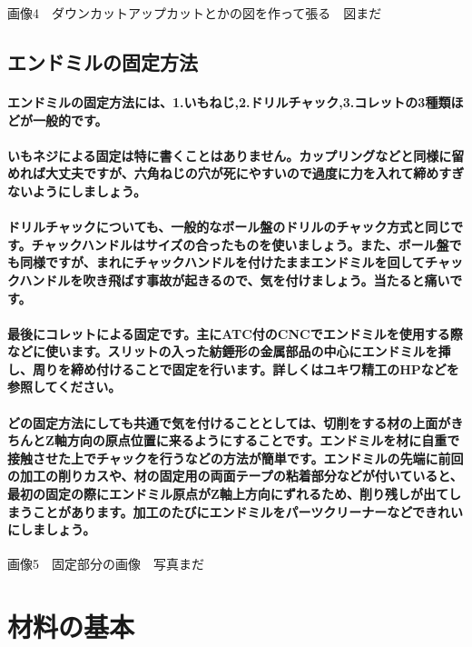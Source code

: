 \documentclass[b5paper, 9pt, twocolumn, titlepage,openany]{jsbook}%
\begin{document}
画像4　ダウンカットアップカットとかの図を作って張る　図まだ

\subsection{エンドミルの固定方法}

\paragraph{エンドミルの固定方法には、1.いもねじ,2.ドリルチャック,3.コレットの3種類ほどが一般的です。}
\paragraph{いもネジによる固定は特に書くことはありません。カップリングなどと同様に留めれば大丈夫ですが、六角ねじの穴が死にやすいので過度に力を入れて締めすぎないようにしましょう。}
\paragraph{ドリルチャックについても、一般的なボール盤のドリルのチャック方式と同じです。チャックハンドルはサイズの合ったものを使いましょう。また、ボール盤でも同様ですが、まれにチャックハンドルを付けたままエンドミルを回してチャックハンドルを吹き飛ばす事故が起きるので、気を付けましょう。当たると痛いです。}
\paragraph{最後にコレットによる固定です。主にATC付のCNCでエンドミルを使用する際などに使います。スリットの入った紡錘形の金属部品の中心にエンドミルを挿し、周りを締め付けることで固定を行います。詳しくはユキワ精工のHPなどを参照してください。}
\paragraph{どの固定方法にしても共通で気を付けることとしては、切削をする材の上面がきちんとZ軸方向の原点位置に来るようにすることです。エンドミルを材に自重で接触させた上でチャックを行うなどの方法が簡単です。エンドミルの先端に前回の加工の削りカスや、材の固定用の両面テープの粘着部分などが付いていると、最初の固定の際にエンドミル原点がZ軸上方向にずれるため、削り残しが出てしまうことがあります。加工のたびにエンドミルをパーツクリーナーなどできれいにしましょう。}

画像5　固定部分の画像　写真まだ

\section{材料の基本}
\end{document}
